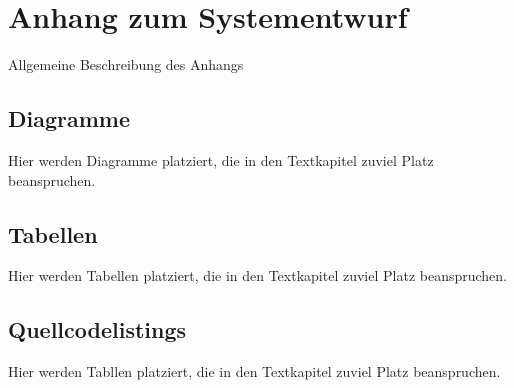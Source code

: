 \chapter{Anhang zum Systementwurf}
Allgemeine Beschreibung des Anhangs

\section{Diagramme}
Hier werden Diagramme platziert, die in den Textkapitel zuviel Platz beanspruchen.
\section{Tabellen}
Hier werden Tabellen platziert, die in den Textkapitel zuviel Platz beanspruchen.
\section{Quellcodelistings}
Hier werden Tabllen platziert, die in den Textkapitel zuviel Platz beanspruchen.
